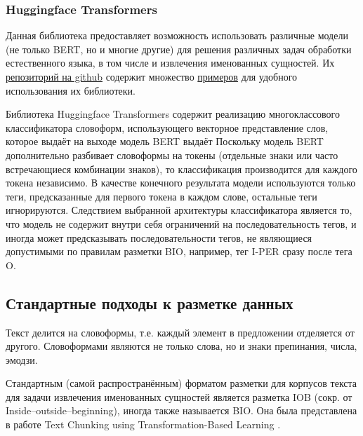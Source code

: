 \subsubsection{Huggingface Transformers}

Данная библиотека предоставляет возможность использовать различные  модели (не только BERT, но и многие другие) для решения различных задач обработки естественного языка, в том числе и извлечения именованных сущностей.
Их \href{https://github.com/huggingface/transformers}{репозиторий на github} содержит множество \href{https://github.com/huggingface/transformers/tree/master/examples/}{примеров} для удобного использования их библиотеки.

Библиотека Huggingface Transformers содержит реализацию многоклассового классификатора словоформ, использующего векторное представление слов, которое выдаёт на выходе модель BERT выдаёт Поскольку модель BERT дополнительно разбивает словоформы на токены (отдельные знаки или часто встречающиеся комбинации знаков), то классификация производится для каждого токена независимо. В качестве конечного результата модели используются только теги, предсказанные для первого токена в каждом слове, остальные теги игнорируются. Следствием выбранной архитектуры классификатора является то, что модель не содержит внутри себя ограничений на последовательность тегов, и иногда может предсказывать последовательности тегов, не являющиеся допустимыми по правилам разметки BIO, например, тег I-PER сразу после тега O.


\subsection{Стандартные подходы к разметке данных}

Текст делится на словоформы, т.е. каждый элемент в предложении отделяется от другого. Словоформами являются не только слова, но и знаки препинания, числа, эмодзи.

Стандартным (самой распространённым) форматом разметки для корпусов текста для задачи извлечения именованных сущностей является разметка IOB (сокр. от Inside–outside–beginning), иногда также называется BIO. Она была представлена в работе Text Chunking using Transformation-Based Learning \cite{DBLP:journals/corr/cmp-lg-9505040}.

